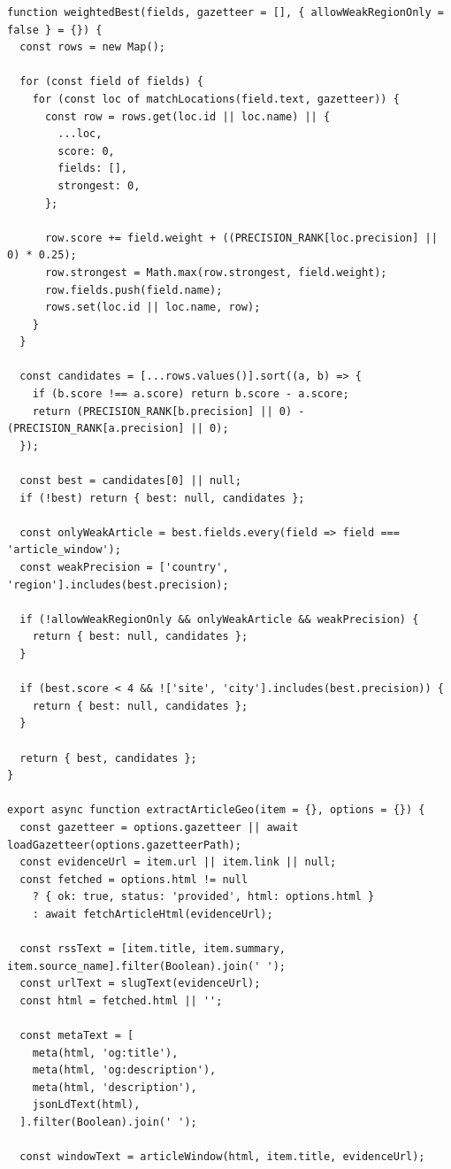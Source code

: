 \documentclass[12pt,a4paper]{article}
\begin{document}
\begin{lstlisting}[style=projectcode,caption={新闻地理位置抽取与地图定位增强}]
function weightedBest(fields, gazetteer = [], { allowWeakRegionOnly = false } = {}) {
  const rows = new Map();

  for (const field of fields) {
    for (const loc of matchLocations(field.text, gazetteer)) {
      const row = rows.get(loc.id || loc.name) || {
        ...loc,
        score: 0,
        fields: [],
        strongest: 0,
      };

      row.score += field.weight + ((PRECISION_RANK[loc.precision] || 0) * 0.25);
      row.strongest = Math.max(row.strongest, field.weight);
      row.fields.push(field.name);
      rows.set(loc.id || loc.name, row);
    }
  }

  const candidates = [...rows.values()].sort((a, b) => {
    if (b.score !== a.score) return b.score - a.score;
    return (PRECISION_RANK[b.precision] || 0) - (PRECISION_RANK[a.precision] || 0);
  });

  const best = candidates[0] || null;
  if (!best) return { best: null, candidates };

  const onlyWeakArticle = best.fields.every(field => field === 'article_window');
  const weakPrecision = ['country', 'region'].includes(best.precision);

  if (!allowWeakRegionOnly && onlyWeakArticle && weakPrecision) {
    return { best: null, candidates };
  }

  if (best.score < 4 && !['site', 'city'].includes(best.precision)) {
    return { best: null, candidates };
  }

  return { best, candidates };
}

export async function extractArticleGeo(item = {}, options = {}) {
  const gazetteer = options.gazetteer || await loadGazetteer(options.gazetteerPath);
  const evidenceUrl = item.url || item.link || null;
  const fetched = options.html != null
    ? { ok: true, status: 'provided', html: options.html }
    : await fetchArticleHtml(evidenceUrl);

  const rssText = [item.title, item.summary, item.source_name].filter(Boolean).join(' ');
  const urlText = slugText(evidenceUrl);
  const html = fetched.html || '';

  const metaText = [
    meta(html, 'og:title'),
    meta(html, 'og:description'),
    meta(html, 'description'),
    jsonLdText(html),
  ].filter(Boolean).join(' ');

  const windowText = articleWindow(html, item.title, evidenceUrl);


\end{lstlisting}
\end{document}
